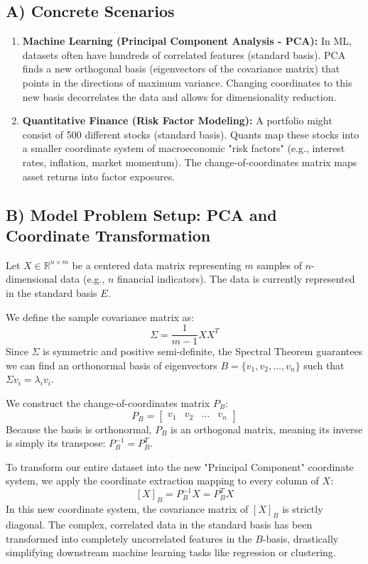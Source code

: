 \documentclass[11pt]{article}
\begin{document}
\subsection{A) Concrete Scenarios}
\begin{enumerate}
    \item \textbf{Machine Learning (Principal Component Analysis - PCA):} In ML, datasets often have hundreds of correlated features (standard basis). PCA finds a new orthogonal basis (eigenvectors of the covariance matrix) that points in the directions of maximum variance. Changing coordinates to this new basis decorrelates the data and allows for dimensionality reduction.
    \item \textbf{Quantitative Finance (Risk Factor Modeling):} A portfolio might consist of 500 different stocks (standard basis). Quants map these stocks into a smaller coordinate system of macroeconomic "risk factors" (e.g., interest rates, inflation, market momentum). The change-of-coordinates matrix maps asset returns into factor exposures.
\end{enumerate}

\subsection{B) Model Problem Setup: PCA and Coordinate Transformation}
Let $X \in \mathbb{R}^{n \times m}$ be a centered data matrix representing $m$ samples of $n$-dimensional data (e.g., $n$ financial indicators). The data is currently represented in the standard basis $E$.

We define the sample covariance matrix as:
\[ \Sigma = \frac{1}{m-1} X X^T \]
Since $\Sigma$ is symmetric and positive semi-definite, the Spectral Theorem guarantees we can find an orthonormal basis of eigenvectors $B = \{v_1, v_2, \dots, v_n\}$ such that $\Sigma v_i = \lambda_i v_i$. 

We construct the change-of-coordinates matrix $P_B$:
\[ P_B = \begin{bmatrix} v_1 & v_2 & \dots & v_n \end{bmatrix} \]
Because the basis is orthonormal, $P_B$ is an orthogonal matrix, meaning its inverse is simply its transpose: $P_B^{-1} = P_B^T$.

To transform our entire dataset into the new "Principal Component" coordinate system, we apply the coordinate extraction mapping to every column of $X$:
\[ [X]_B = P_B^{-1} X = P_B^T X \]
In this new coordinate system, the covariance matrix of $[X]_B$ is strictly diagonal. The complex, correlated data in the standard basis has been transformed into completely uncorrelated features in the $B$-basis, drastically simplifying downstream machine learning tasks like regression or clustering.
\end{document}
